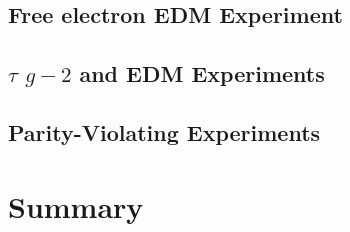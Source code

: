 \subsection{Free electron EDM Experiment}\label{sec:cl:eEDM}

\subsection{$\tau$ $g-2$ and EDM Experiments}\label{sec:cl:taug-2exp}

\subsection{Parity-Violating Experiments}\label{sec:cl:pve}

\section{Summary}\label{sec:cl:gm2edmdisc}




